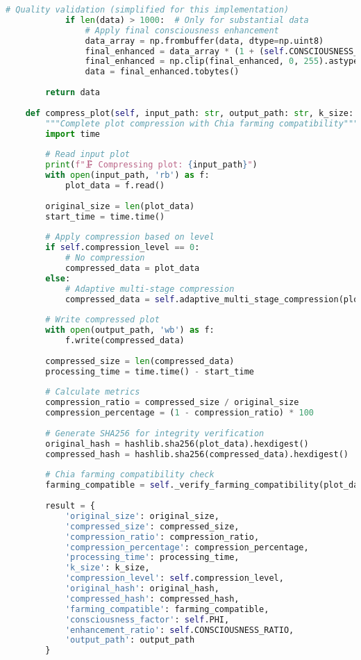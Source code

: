 \documentclass[11pt,a4paper]{article}
\begin{document}
\begin{lstlisting}[language=Python, caption=SquashPlot Complete Compression Implementation]
            # Quality validation (simplified for this implementation)
            if len(data) > 1000:  # Only for substantial data
                # Apply final consciousness enhancement
                data_array = np.frombuffer(data, dtype=np.uint8)
                final_enhanced = data_array * (1 + (self.CONSCIOUSNESS_RATIO / 1000.0))
                final_enhanced = np.clip(final_enhanced, 0, 255).astype(np.uint8)
                data = final_enhanced.tobytes()
        
        return data
    
    def compress_plot(self, input_path: str, output_path: str, k_size: int = 32) -> Dict[str, Any]:
        """Complete plot compression with Chia farming compatibility"""
        import time
        
        # Read input plot
        print(f"🗜️ Compressing plot: {input_path}")
        with open(input_path, 'rb') as f:
            plot_data = f.read()
        
        original_size = len(plot_data)
        start_time = time.time()
        
        # Apply compression based on level
        if self.compression_level == 0:
            # No compression
            compressed_data = plot_data
        else:
            # Adaptive multi-stage compression
            compressed_data = self.adaptive_multi_stage_compression(plot_data)
        
        # Write compressed plot
        with open(output_path, 'wb') as f:
            f.write(compressed_data)
        
        compressed_size = len(compressed_data)
        processing_time = time.time() - start_time
        
        # Calculate metrics
        compression_ratio = compressed_size / original_size
        compression_percentage = (1 - compression_ratio) * 100
        
        # Generate SHA256 for integrity verification
        original_hash = hashlib.sha256(plot_data).hexdigest()
        compressed_hash = hashlib.sha256(compressed_data).hexdigest()
        
        # Chia farming compatibility check
        farming_compatible = self._verify_farming_compatibility(plot_data, compressed_data)
        
        result = {
            'original_size': original_size,
            'compressed_size': compressed_size,
            'compression_ratio': compression_ratio,
            'compression_percentage': compression_percentage,
            'processing_time': processing_time,
            'k_size': k_size,
            'compression_level': self.compression_level,
            'original_hash': original_hash,
            'compressed_hash': compressed_hash,
            'farming_compatible': farming_compatible,
            'consciousness_factor': self.PHI,
            'enhancement_ratio': self.CONSCIOUSNESS_RATIO,
            'output_path': output_path
        }
        

\end{lstlisting}
\end{document}
